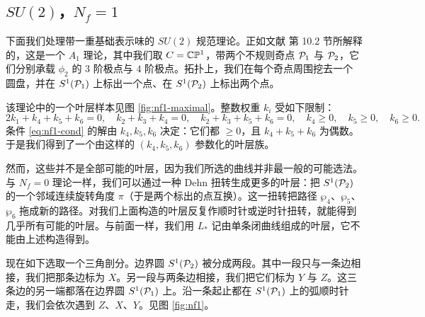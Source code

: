 
\subsection{$SU(2)$，$N_f = 1$}

下面我们处理带一重基础表示味的 $SU(2)$ 规范理论。正如文献 \cite{Gaiotto:2009hg} 第 10.2 节所解释的，这是一个 $A_1$ 理论，其中我们取 $C = \mathbb{C}\mathbb{P}^1$，带两个不规则奇点 $\mathcal{P}_1$ 与 $\mathcal{P}_2$，它们分别承载 $\phi_2$ 的 $3$ 阶极点与 $4$ 阶极点。拓扑上，我们在每个奇点周围挖去一个圆盘，并在 $S^1(\mathcal{P}_1)$ 上标出一个点、在 $S^1(\mathcal{P}_2)$ 上标出两个点。

该理论中的一个叶层样本见图 \ref{fig:nf1-maximal}。整数权重 $k_i$ 受如下限制：
\begin{equation} \label{eq:nf1-cond}
2 k_1 + k_4 + k_5 + k_6 = 0, \quad k_2 + k_3 + k_4 = 0, \quad k_2 + k_3 + k_5 + k_6 = 0, \quad k_4 \ge 0, \quad k_5 \ge 0, \quad k_6 \ge 0.
\end{equation}
条件 \eqref{eq:nf1-cond} 的解由 $k_4, k_5, k_6$ 决定：它们都 $\ge 0$，且 $k_4 + k_5 + k_6$ 为偶数。
于是我们得到了一个由这样的 $(k_4, k_5, k_6)$ 参数化的叶层族。

然而，这些并不是全部可能的叶层，因为我们所选的曲线并非最一般的可能选法。与 $N_f = 0$ 理论一样，我们可以通过一种 Dehn 扭转生成更多的叶层：把 $S^1(\mathcal{P}_2)$ 的一个邻域连续旋转角度 $\pi$（于是两个标出的点互换）。这一扭转把路径 $\wp_4$、$\wp_5$、$\wp_6$ 拖成新的路径。对我们上面构造的叶层反复作顺时针或逆时针扭转，就能得到几乎所有可能的叶层。与前面一样，我们用 $L_*$ 记由单条闭曲线组成的叶层，它不能由上述构造得到。

现在如下选取一个三角剖分。边界圆 $S^1(\mathcal{P}_2)$ 被分成两段。其中一段只与一条边相接，我们把那条边标为 $X$。另一段与两条边相接，我们把它们标为 $Y$ 与 $Z$。这三条边的另一端都落在边界圆 $S^1(\mathcal{P}_1)$ 上。沿一条起止都在 $S^1(\mathcal{P}_1)$ 上的弧顺时针走，我们会依次遇到 $Z$、$X$、$Y$。见图 \ref{fig:nf1}。

